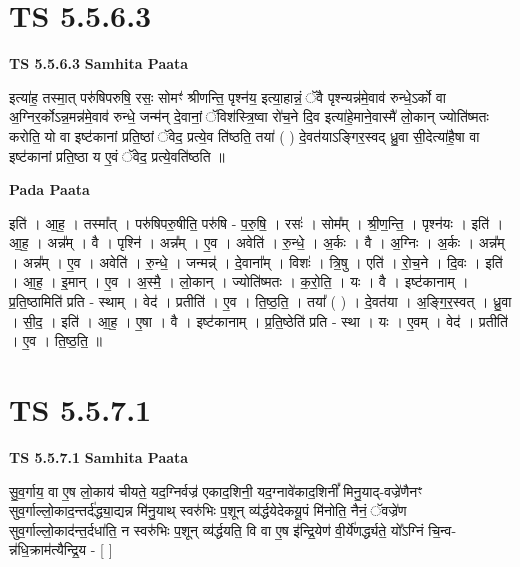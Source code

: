 \documentclass[17pt]{extarticle}
\begin{document}

\section{ TS 5.5.6.3 }

\textbf{TS 5.5.6.3 } \newline
\textbf{Samhita Paata} \newline

इत्या॑ह॒ तस्मा॒त् परु॑षिपरुषि॒ रसः॒ सोमꣳ॑ श्रीणन्ति॒ पृश्न॑य॒ इत्या॒हान्नं॒ ॅवै पृश्न्यन्न॑मे॒वाव॑ रुन्धे॒ऽर्को वा अ॒ग्निर॒र्कोऽन्न॒मन्न॑मे॒वाव॑ रुन्धे॒ जन्म॑न् दे॒वानां॒ ॅविश॑स्त्रि॒ष्वा रो॑च॒ने दि॒व इत्या॑हे॒माने॒वास्मै॑ लो॒कान् ज्योति॑ष्मतः करोति॒ यो वा इष्ट॑कानां प्रति॒ष्ठां ॅवेद॒ प्रत्ये॒व ति॑ष्ठति॒ तया॑ ( ) दे॒वत॑याऽङ्गिर॒स्वद् ध्रु॒वा सी॒देत्या॑है॒षा वा इष्ट॑कानां प्रति॒ष्ठा य ए॒वं ॅवेद॒ प्रत्ये॒वति॑ष्ठति ॥ \newline

\textbf{Pada Paata} \newline

इति॑ । आ॒ह॒ । तस्मा᳚त् । परु॑षिपरु॒षीति॒ परु॑षि - प॒रु॒षि॒ । रसः॑ । सोम᳚म् । श्री॒ण॒न्ति॒ । पृश्न॑यः । इति॑ । आ॒ह॒ । अन्न᳚म् । वै । पृश्नि॑ । अन्न᳚म् । ए॒व । अवेति॑ । रु॒न्धे॒ । अ॒र्कः । वै । अ॒ग्निः । अ॒र्कः । अन्न᳚म् । अन्न᳚म् । ए॒व । अवेति॑ । रु॒न्धे॒ । जन्मन्न्॑ । दे॒वाना᳚म् । विशः॑ । त्रि॒षु । एति॑ । रो॒च॒ने । दि॒वः । इति॑ । आ॒ह॒ । इ॒मान् । ए॒व । अ॒स्मै॒ । लो॒कान् । ज्योति॑ष्मतः । क॒रो॒ति॒ । यः । वै । इष्ट॑कानाम् । प्र॒ति॒ष्ठामिति॑ प्रति - स्थाम् । वेद॑ । प्रतीति॑ । ए॒व । ति॒ष्ठ॒ति॒ । तया᳚ ( ) । दे॒वत॑या । अ॒ङ्गि॒र॒स्वत् । ध्रु॒वा । सी॒द॒ । इति॑ । आ॒ह॒ । ए॒षा । वै । इष्ट॑कानाम् । प्र॒ति॒ष्ठेति॑ प्रति - स्था । यः । ए॒वम् । वेद॑ । प्रतीति॑ । ए॒व । ति॒ष्ठ॒ति॒ ॥  \newline





\section{ TS 5.5.7.1 }

\textbf{TS 5.5.7.1 } \newline
\textbf{Samhita Paata} \newline

सु॒व॒र्गाय॒ वा ए॒ष लो॒काय॑ चीयते॒ यद॒ग्निर्वज्र॑ एकाद॒शिनी॒ यद॒ग्नावे॑काद॒शिनीं᳚ मिनु॒याद्-वज्रे॑णैनꣳ सुव॒र्गाल्लो॒काद॒न्तर्द॑द्ध्या॒द्यन्न मि॑नु॒याथ् स्वरु॑भिः प॒शून् व्य॑र्द्धयेदेकयू॒पं मि॑नोति॒ नैनं॒ ॅवज्रे॑ण सुव॒र्गाल्लो॒काद॑न्त॒र्दधा॑ति॒ न स्वरु॑भिः प॒शून् व्य॑र्द्धयति॒ वि वा ए॒ष इ॑न्द्रि॒येण॑ वी॒र्ये॑णर्द्ध्यते॒ यो᳚ऽग्निं चि॒न्व-न्न॑धि॒क्राम॑त्यैन्द्रि॒य - [  ] \newline
\end{document}
